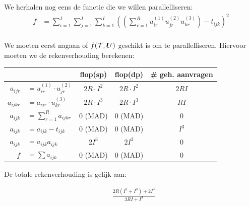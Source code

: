 We herhalen nog eens de functie die we willen parallelliseren:
\begin{align*}
	f &= \sum_{i = 1}^I \sum_{j = 1}^I \sum_{k = 1}^I \left( \left( \sum_{r=1}^{R} u^{(1)}_{i r} u^{(2)}_{j r} u^{(3)}_{k r} \right) - t_{ijk}\right)^2 \\
\end{align*}

We moeten eerst nagaan of $f(\mathcal{T}, \boldsymbol{U})$ geschikt is om te parallelliseren. Hiervoor moeten we de rekenverhouding berekenen:\\
\begin{tabular}{|r l|c| c|c|}
\hline
					&							& flop(sp)			& flop(dp) 			& \# geh. aanvragen	\\
\hline
$a_{ij r} $	&$= u^{(1)}_{i r} \cdot%
u^{(2)}_{j r}$									& $2 R \cdot I^2$	& $2 R \cdot I^2$	&	$2RI$			\\
$a_{ijk r} $&$= a_{ij r} \cdot u^{(3)}_{k r}$	& $2 R \cdot I^3$	& $2 R \cdot I^3$	&	$RI$			\\
$a_{ijk} $	&$= \sum_{r=1}^{R} a_{ijk r}$		& 0 (MAD)			& 0 (MAD)			&	$0$				\\
\hline
$a_{ijk} $	&$= a_{ijk}  - t_{ijk}$				& 0 (MAD)			& 0 (MAD)			&	$I^3$			\\
$a_{ijk} $	&$= a_{ijk} a_{ijk}$				& $2 I^3$			& $2 I^3$			&	0				\\
$f $		&$= \sum a_{ijk}$					& 0 (MAD)			& 0 (MAD)			&	0				\\
\hline
\end{tabular}




De totale rekenverhouding is gelijk aan:

\begin{align*}
    & \frac{2R (I^2 + I^3) + 2I^3}{3RI + I^3}\\
\end{align*}

